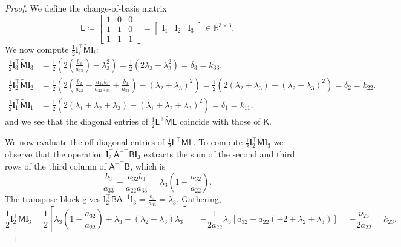 \documentclass[10pt,a4paper]{amsart}
\newcommand{\Real}{\mathbb{R}}
\newcommand{\bfl}{\boldsymbol{l}}
\newcommand{\msfA}{\mathsf{A}}
\newcommand{\msfB}{\mathsf{B}}
\newcommand{\msfK}{\mathsf{K}}
\newcommand{\msfL}{\mathsf{L}}
\newcommand{\msfM}{\mathsf{M}}
\begin{document}
\begin{proof}
  We define the change-of-basis matrix
  \begin{equation*}
    \msfL \coloneqq
    \begin{bmatrix}
      1 & 0 & 0 \\
      1 & 1 & 0 \\
      1 & 1 & 1
    \end{bmatrix}
    = \begin{bmatrix}
        \bfl_1 & \bfl_2 & \bfl_3
      \end{bmatrix} \in \Real^{3 \times 3}.
  \end{equation*}
  We now compute $\frac{1}{2} \bfl_i^\top \tilde{\msfM} \bfl_i$:
  \begin{align*}
    \frac{1}{2} \bfl_3^\top \tilde{\msfM} \bfl_3 &= \frac{1}{2} \left( 2\left(\frac{b_3}{a_{33}}\right) - \lambda_3^2 \right) = \frac{1}{2}(2\lambda_3 - \lambda_3^2) = \delta_3 = k_{33}. \\
    \frac{1}{2} \bfl_2^\top \tilde{\msfM} \bfl_2 &= \frac{1}{2} \left( 2\left( \frac{b_2}{a_{22}} - \frac{a_{32}b_3}{a_{22}a_{33}} + \frac{b_3}{a_{33}} \right) - (\lambda_2+\lambda_3)^2 \right) = \frac{1}{2} \left( 2(\lambda_2+\lambda_3) - (\lambda_2+\lambda_3)^2 \right) = \delta_2 = k_{22}. \\
    \frac{1}{2} \bfl_1^\top \tilde{\msfM} \bfl_1 &= \frac{1}{2} \left( 2(\lambda_1+\lambda_2+\lambda_3) - (\lambda_1+\lambda_2+\lambda_3)^2 \right) = \delta_1 = k_{11},
  \end{align*}
  and we see that the diagonal entries of $\frac12\msfL^\top \tilde{\msfM} \msfL$ coincide with those of $\msfK$.
  
  We now evaluate the off-diagonal entries of $\frac12\msfL^\top \tilde{\msfM} \msfL$. To compute $\frac{1}{2} \bfl_2^\top \tilde{\msfM} \bfl_3$ we observe that the operation $\bfl_2^\top \msfA^{-\top} \msfB \bfl_3$ extracts the sum of the second and third rows of the third column of $\msfA^{-\top}\msfB$, which is 
  \[
    \frac{b_3}{a_{33}} - \frac{a_{32}b_3}{a_{22}a_{33}} = \lambda_3\left(1 - \frac{a_{32}}{a_{22}}\right).
  \]
  The transpose block gives $\bfl_2^\top \msfB \msfA^{-1} \bfl_3 = \frac{b_3}{a_{33}} = \lambda_3$. Gathering,
  \[
    \frac{1}{2} \bfl_2^\top \tilde{\msfM} \bfl_3 = \frac{1}{2} \left[ \lambda_3 \left(1 - \frac{a_{32}}{a_{22}}\right) + \lambda_3 - (\lambda_2 + \lambda_3)\lambda_3 \right] 
    = -\frac{1}{2a_{22}} \lambda_3 \left[ a_{32} + a_{22}(-2 + \lambda_2 + \lambda_3) \right] = -\frac{\nu_{23}}{2a_{22}} = k_{23}.
  \]


\end{proof}
\end{document}

